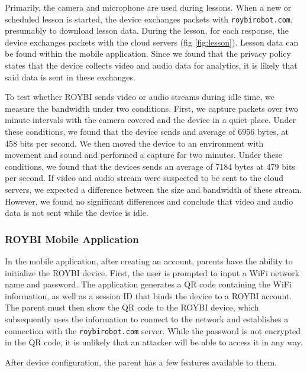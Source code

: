 \documentclass[12pt]{ucthesis}
\begin{document}
Primarily, the camera and microphone are used during lessons. When a new or scheduled lesson is started, the device exchanges packets with \texttt{roybirobot.com}, presumably to download lesson data. During the lesson, for each response, the device exchanges packets with the cloud servers (fig \ref{fig:lesson}). Lesson data can be found within the mobile application. Since we found that the privacy policy states that the device collects video and audio data for analytics, it is likely that said data is sent in these exchanges.

To test whether ROYBI sends video or audio streams during idle time, we measure the bandwidth under two conditions. First, we capture packets over two minute intervals with the camera covered and the device in a quiet place. Under these conditions, we found that the device sends and average of 6956 bytes, at 458 bits per second. We then moved the device to an environment with movement and sound and performed a capture for two minutes. Under these conditions, we found that the devices sends an average of 7184 bytes at 479 bits per second. If video and audio stream were suspected to be sent to the cloud servers, we expected a difference between the size and bandwidth of these stream. However, we found no significant differences and conclude that video and audio data is not sent while the device is idle.

\subsubsection{ROYBI Mobile Application}
In the mobile application, after creating an account, parents have the ability to initialize the ROYBI device. First, the user is prompted to input a WiFi network name and password. The application generates a QR code containing the WiFi information, as well as a session ID that binds the device to a ROYBI account. The parent must then show the QR code to the ROYBI device, which subsequently uses the information to connect to the network and establishes a connection with the \texttt{roybirobot.com} server. While the password is not encrypted in the QR code, it is unlikely that an attacker will be able to access it in any way.

After device configuration, the parent has a few features available to them.
\end{document}

